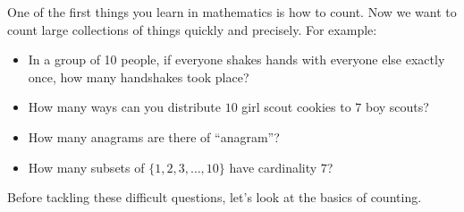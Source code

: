 \documentclass[12pt]{article}
\begin{document}
One of the first things you learn in mathematics is how to count.  Now we want to count large collections of things quickly and precisely.  For example:
\begin{itemize}
 \item In a group of 10 people, if everyone shakes hands with everyone else exactly once, how many handshakes took place? %
 \item How many ways can you distribute $10$ girl scout cookies to $7$ boy scouts?
 \item How many anagrams are there of ``anagram''?
 \item How many subsets of $\{1,2,3,\ldots, 10\}$ have cardinality $7$?
\end{itemize}

Before tackling these difficult questions, let's look at the basics of counting.
\end{document}

